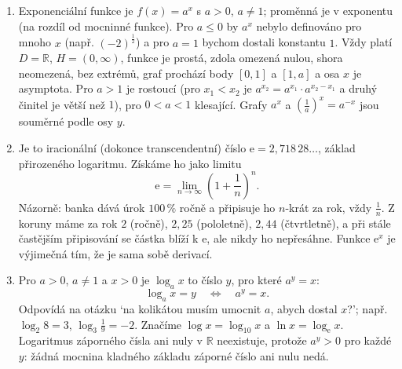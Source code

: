 \begin{enumerate}[label=\textbf{\arabic*.}, leftmargin=*, itemsep=0.8em]
  \item {}
  Exponenciální funkce je $f(x) = a^x$ s $a > 0$, $a\neq 1$; proměnná je v exponentu (na rozdíl od mocninné funkce). Pro $a\leq 0$ by $a^x$ nebylo definováno pro mnoho $x$ (např. ${(-2)}^{\frac{1}{2}}$) a pro $a = 1$ bychom dostali konstantu $1$. Vždy platí $D = \mathbb{R}$, $H = (0, \infty)$, funkce je prostá, zdola omezená nulou, shora neomezená, bez extrémů, graf prochází body $[0, 1]$ a $[1, a]$ a osa $x$ je asymptota. Pro $a > 1$ je rostoucí (pro $x_1 < x_2$ je $a^{x_2} = a^{x_1}\cdot a^{x_2 - x_1}$ a druhý činitel je větší než $1$), pro $0 < a < 1$ klesající. Grafy $a^x$ a ${\left(\frac{1}{a}\right)}^x = a^{-x}$ jsou souměrné podle osy $y$. 

  \item {}
  Je to iracionální (dokonce transcendentní) číslo $\mathrm{e} = 2{,}718\,28\ldots$, základ přirozeného logaritmu. Získáme ho jako limitu
  \begin{equation*}
    \mathrm{e} = \lim_{n\to\infty}{\left(1 + \frac{1}{n}\right)}^n.
  \end{equation*}
  Názorně: banka dává úrok $100\,\%$ ročně a připisuje ho $n$-krát za rok, vždy $\frac{1}{n}$. Z koruny máme za rok $2$ (ročně), $2{,}25$ (pololetně), $2{,}44$ (čtvrtletně), a při stále častějším připisování se částka blíží k $\mathrm{e}$, ale nikdy ho nepřesáhne. Funkce $\mathrm{e}^x$ je výjimečná tím, že je sama sobě derivací. 

  \item {}
  Pro $a > 0$, $a\neq 1$ a $x > 0$ je $\log_a x$ to číslo $y$, pro které $a^y = x$:
  \begin{equation*}
    \log_a x = y \quad\Leftrightarrow\quad a^y = x.
  \end{equation*}
  Odpovídá na otázku `na kolikátou musím umocnit $a$, abych dostal $x$?'; např. $\log_2 8 = 3$, $\log_3\frac{1}{9} = -2$. Značíme $\log x = \log_{10} x$ a $\ln x = \log_{\mathrm{e}} x$. Logaritmus záporného čísla ani nuly v $\mathbb{R}$ neexistuje, protože $a^y > 0$ pro každé $y$: žádná mocnina kladného základu záporné číslo ani nulu nedá. 


\end{enumerate}
